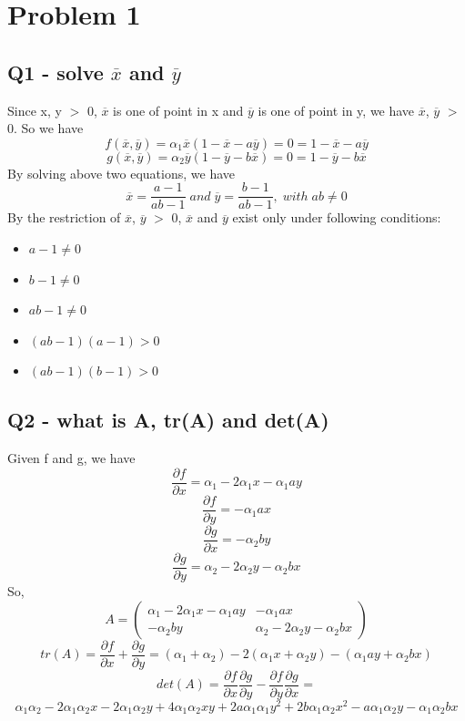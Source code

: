 \documentclass [12pt] {article}
\begin{document}
	\section {Problem 1}
	\subsection {Q1 - solve $\overline{x}$ and $\overline{y}$}
	Since x, y $>$ 0, $\overline{x}$ is one of point in x and $\overline{y}$ is one of point in y, we have $\overline{x}$, $\overline{y}$ $>$ 0. So we have
	\[f(\overline{x}, \overline{y}) = \alpha_1\overline{x}(1-\overline{x}-a\overline{y})=0=1-\overline{x}-a\overline{y}\]
	\[g(\overline{x}, \overline{y}) = \alpha_2\overline{y}(1-\overline{y}-b\overline{x})=0=1-\overline{y}-b\overline{x}\]
	By solving above two equations, we have
	\[\overline{x} = \frac{a-1}{ab-1} \;and \;\overline{y} = \frac{b-1}{ab-1}, \;with \;ab\neq 0\]
	By the restriction of $\overline{x}$, $\overline{y}$ $>$ 0, $\overline{x}$ and $\overline{y}$ exist only under following conditions:
	\begin {itemize}
		\item $a-1 \neq 0$
		\item $b-1 \neq 0$
		\item $ab-1 \neq 0$
		\item $(ab-1)(a-1) > 0$
		\item $(ab-1)(b-1) > 0$
	\end {itemize}
	\subsection {Q2 - what is A, tr(A) and det(A)}
	Given f and g, we have
	\[\frac{\partial f}{\partial x} = \alpha_1 - 2\alpha_1x-\alpha_1ay\]
	\[\frac{\partial f}{\partial y} = -\alpha_1ax\]
	\[\frac{\partial g}{\partial x} = -\alpha_2by\]
	\[\frac{\partial g}{\partial y} = \alpha_2 - 2\alpha_2y-\alpha_2bx\]
	So,
	\[A = \left( \begin{array}{cc} \alpha_1-2\alpha_1x-\alpha_1ay & -\alpha_1ax \\ -\alpha_2by & \alpha_2-2\alpha_2y-\alpha_2bx\end{array} \right)\]
	\[tr(A) = \frac{\partial f}{\partial x} + \frac{\partial g}{\partial y} = (\alpha_1+\alpha_2) - 2(\alpha_1x+\alpha_2y)-(\alpha_1ay+\alpha_2bx)\]
	\[det(A) = \frac{\partial f}{\partial x}\frac{\partial g}{\partial y} - \frac{\partial f}{\partial y}\frac{\partial g}{\partial x} = \]
	\[\alpha_1\alpha_2 - 2\alpha_1\alpha_2 x - 2\alpha_1\alpha_2 y + 4\alpha_1\alpha_2 xy + 2a\alpha_1\alpha_1 y^2 + 2b\alpha_1\alpha_2 x^2 - a\alpha_1\alpha_2 y - \alpha_1\alpha_2 bx\]
\end{document}
